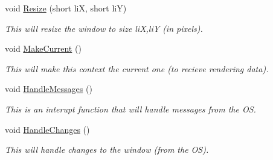 \begin{DoxyCompactItemize}
void \hyperlink{classc_window_a38129c91195b1e7f5711aecc1ffb4d77}{Resize} (short liX, short liY)
\begin{DoxyCompactList}\small\item\em This will resize the window to size liX,liY (in pixels). \item\end{DoxyCompactList}\item 
void \hyperlink{classc_window_a0b0428b5d7094404f403281bae6c7221}{MakeCurrent} ()
\begin{DoxyCompactList}\small\item\em This will make this context the current one (to recieve rendering data). \item\end{DoxyCompactList}\item 
void \hyperlink{classc_window_ac23fea85dd29cd393618fc3c24d912f9}{HandleMessages} ()
\begin{DoxyCompactList}\small\item\em This is an interupt function that will handle messages from the OS. \item\end{DoxyCompactList}\item 
void \hyperlink{classc_window_a5efca9fcc3b017d400737ec0ad483809}{HandleChanges} ()
\begin{DoxyCompactList}\small\item\em This will handle changes to the window (from the OS). \item\end{DoxyCompactList}\end{DoxyCompactItemize}
